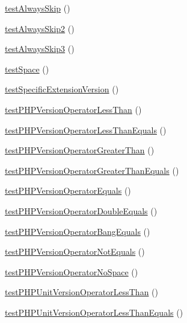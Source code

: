 \begin{DoxyCompactItemize}
\mbox{\hyperlink{class_requirements_test_a58d74c9e4afb2e8130d3c042741a33e3}{test\+Always\+Skip}} ()
\item 
\mbox{\hyperlink{class_requirements_test_a9213cb3e29684c1352215d6860db89c2}{test\+Always\+Skip2}} ()
\item 
\mbox{\hyperlink{class_requirements_test_a178cc10d0c31c09db42314ca98e804a4}{test\+Always\+Skip3}} ()
\item 
\mbox{\hyperlink{class_requirements_test_a4a06c49665c1b2864b29e707e691c4ed}{test\+Space}} ()
\item 
\mbox{\hyperlink{class_requirements_test_aedfe7e23744bf17891b7dd2d3e99f17a}{test\+Specific\+Extension\+Version}} ()
\item 
\mbox{\hyperlink{class_requirements_test_ae546a0f18f39b6121cee1d482d88a38e}{test\+P\+H\+P\+Version\+Operator\+Less\+Than}} ()
\item 
\mbox{\hyperlink{class_requirements_test_a2392fca7acc63ed201a729844d22ac2a}{test\+P\+H\+P\+Version\+Operator\+Less\+Than\+Equals}} ()
\item 
\mbox{\hyperlink{class_requirements_test_a9d6abfc990749387e29458745c758e42}{test\+P\+H\+P\+Version\+Operator\+Greater\+Than}} ()
\item 
\mbox{\hyperlink{class_requirements_test_a773eafb9c1282d0580d54cc50a91d669}{test\+P\+H\+P\+Version\+Operator\+Greater\+Than\+Equals}} ()
\item 
\mbox{\hyperlink{class_requirements_test_a650a5d516b8624d20a0b25b8d91951ae}{test\+P\+H\+P\+Version\+Operator\+Equals}} ()
\item 
\mbox{\hyperlink{class_requirements_test_a0b51657f8d36bad09ffdb47a71c7ca68}{test\+P\+H\+P\+Version\+Operator\+Double\+Equals}} ()
\item 
\mbox{\hyperlink{class_requirements_test_ac7cdb65151fa93ac2f1fc6044c9cd53c}{test\+P\+H\+P\+Version\+Operator\+Bang\+Equals}} ()
\item 
\mbox{\hyperlink{class_requirements_test_aba4841367c91d275c615318d2296227c}{test\+P\+H\+P\+Version\+Operator\+Not\+Equals}} ()
\item 
\mbox{\hyperlink{class_requirements_test_a657a182ad044ae78a80bbeb8b58bc8bd}{test\+P\+H\+P\+Version\+Operator\+No\+Space}} ()
\item 
\mbox{\hyperlink{class_requirements_test_abe24c5fab20a61afa5d86b775aa7af3b}{test\+P\+H\+P\+Unit\+Version\+Operator\+Less\+Than}} ()
\item 
\mbox{\hyperlink{class_requirements_test_ac2af8d235b1a1c2ecc2d904cb3ec50b3}{test\+P\+H\+P\+Unit\+Version\+Operator\+Less\+Than\+Equals}} ()

\end{DoxyCompactItemize}
